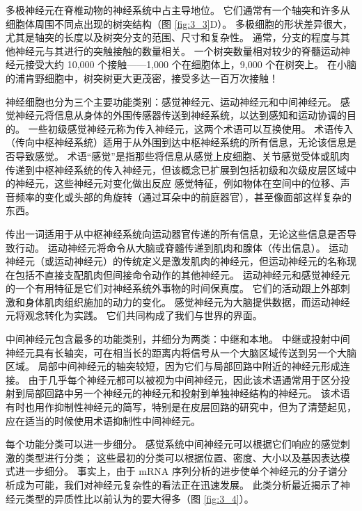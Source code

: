 多极神经元在脊椎动物的神经系统中占主导地位。 
它们通常有一个轴突和许多从细胞体周围不同点出现的树突结构（图 \ref{fig:3_3}D）。 
多极细胞的形状差异很大，尤其是轴突的长度以及树突分支的范围、尺寸和复杂性。 
通常，分支的程度与其他神经元与其进行的突触接触的数量相关。 
一个树突数量相对较少的脊髓运动神经元接受大约 10,000 个接触——1,000 个在细胞体上，9,000 个在树突上。 
在小脑的浦肯野细胞中，树突树更大更茂密，接受多达一百万次接触！


神经细胞也分为三个主要功能类别：感觉神经元、运动神经元和中间神经元。 
感觉神经元将信息从身体的外围传感器传送到神经系统，以达到感知和运动协调的目的。 
一些初级感觉神经元称为传入神经元，这两个术语可以互换使用。 
术语传入（传向中枢神经系统）适用于从外围到达中枢神经系统的所有信息，无论该信息是否导致感觉。 
术语“感觉”是指那些将信息从感觉上皮细胞、关节感觉受体或肌肉传递到中枢神经系统的传入神经元，但该概念已扩展到包括初级和次级皮层区域中的神经元，这些神经元对变化做出反应 感觉特征，例如物体在空间中的位移、声音频率的变化或头部的角旋转（通过耳朵中的前庭器官），甚至像面部这样复杂的东西。


传出一词适用于从中枢神经系统向运动器官传递的所有信息，无论这些信息是否导致行动。 
运动神经元将命令从大脑或脊髓传递到肌肉和腺体（传出信息）。 
运动神经元（或运动神经元）的传统定义是激发肌肉的神经元，但运动神经元的名称现在包括不直接支配肌肉但间接命令动作的其他神经元。 
运动神经元和感觉神经元的一个有用特征是它们对神经系统外事物的时间保真度。 
它们的活动跟上外部刺激和身体肌肉组织施加的动力的变化。 
感觉神经元为大脑提供数据，而运动神经元将观念转化为实践。 
它们共同构成了我们与世界的界面。


中间神经元包含最多的功能类别，并细分为两类：中继和本地。 
中继或投射中间神经元具有长轴突，可在相当长的距离内将信号从一个大脑区域传送到另一个大脑区域。 
局部中间神经元的轴突较短，因为它们与局部回路中附近的神经元形成连接。 
由于几乎每个神经元都可以被视为中间神经元，因此该术语通常用于区分投射到局部回路中另一个神经元的神经元和投射到单独神经结构的神经元。 
该术语有时也用作抑制性神经元的简写，特别是在皮层回路的研究中，但为了清楚起见，应在适当的时候使用术语抑制性中间神经元。


每个功能分类可以进一步细分。 
感觉系统中间神经元可以根据它们响应的感觉刺激的类型进行分类； 
这些最初的分类可以根据位置、密度、大小以及基因表达模式进一步细分。 
事实上，由于 mRNA 序列分析的进步使单个神经元的分子谱分析成为可能，我们对神经元复杂性的看法正在迅速发展。 
此类分析最近揭示了神经元类型的异质性比以前认为的要大得多（图 \ref{fig:3_4}）。

